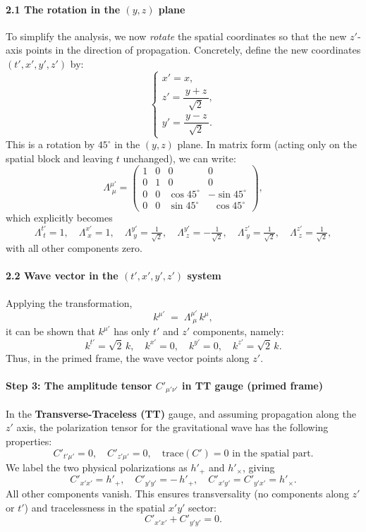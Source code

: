 \documentclass{article}
\begin{document}
\paragraph{2.1 The rotation in the $(y,z)$ plane}
To simplify the analysis, we now \emph{rotate} the spatial coordinates so that the new $z'$-axis points in the direction of propagation. Concretely, define the new coordinates $(t', x', y', z')$ by:
\[
\begin{cases}
x' = x,\\[6pt]
z' = \dfrac{\,y + z\,}{\sqrt{2}},\\[6pt]
y' = \dfrac{\,y - z\,}{\sqrt{2}}.
\end{cases}
\]
This is a rotation by $45^\circ$ in the $(y,z)$ plane. In matrix form (acting only on the spatial block and leaving $t$ unchanged), we can write:
\[
\Lambda^{\mu'}_{\;\mu}
=
\begin{pmatrix}
1 & 0 & 0 & 0\\
0 & 1 & 0 & 0\\
0 & 0 & \cos 45^\circ & -\sin 45^\circ \\
0 & 0 & \sin 45^\circ & \;\;\cos 45^\circ
\end{pmatrix},
\]
which explicitly becomes
\[
\Lambda^{t'}_{\;t} = 1,\quad
\Lambda^{x'}_{\;x} = 1,\quad
\Lambda^{y'}_{\;y} = \tfrac{1}{\sqrt{2}}, \quad
\Lambda^{y'}_{\;z} = -\tfrac{1}{\sqrt{2}}, \quad
\Lambda^{z'}_{\;y} = \tfrac{1}{\sqrt{2}}, \quad
\Lambda^{z'}_{\;z} = \tfrac{1}{\sqrt{2}},
\]
with all other components zero.

\paragraph{2.2 Wave vector in the $(t',x',y',z')$ system}
Applying the transformation,
\[
k^{\mu'} \;=\; \Lambda^{\mu'}_{\;\mu}\,k^\mu,
\]
it can be shown that $k^{\mu'}$ has only $t'$ and $z'$ components, namely:
\[
k^{t'} = \sqrt{2}\,k,\quad
k^{x'} = 0,\quad
k^{y'} = 0,\quad
k^{z'} = \sqrt{2}\,k.
\]
Thus, in the primed frame, the wave vector points along $z'$.

\bigskip

\paragraph{Step 3: The amplitude tensor $C'_{\mu'\nu'}$ in TT gauge (primed frame)}

In the \textbf{Transverse-Traceless (TT)} gauge, and assuming propagation along the $z'$ axis, the polarization tensor for the gravitational wave has the following properties:
\[
C'_{t'\mu'} = 0,
\quad
C'_{z'\mu'} = 0,
\quad
\text{trace}(C')=0 \text{ in the spatial part}.
\]
We label the two physical polarizations as $h'_+$ and $h'_\times$, giving
\[
C'_{x'x'} = h'_+,\quad
C'_{y'y'} = -\,h'_+,\quad
C'_{x'y'} = C'_{y'x'} = h'_\times.
\]
All other components vanish. This ensures transversality (no components along $z'$ or $t'$) and tracelessness in the spatial $x'y'$ sector:
\[
C'_{x'x'} + C'_{y'y'} = 0.
\]
\end{document}

